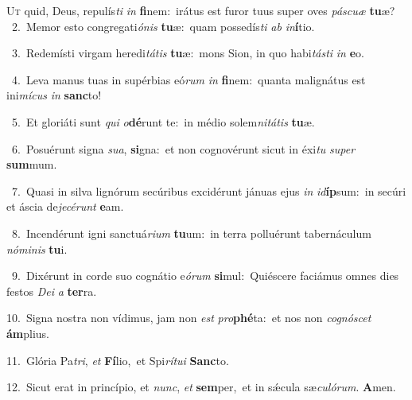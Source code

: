 \lettrine{\initial\textcolor{\initialcolor}{U}}{t} quid, Deus, repulís\textit{ti} \textit{in} \textbf{fi}\-nem:~\star irátus est furor tuus super oves \textit{pás}\-\textit{cu}\textit{æ} \textbf{tu}\-æ?\\
{\numbfont\textcolor{\numbcolor}{~2.}}~Memor esto congregati\-\textit{ó}\-\textit{nis} \textbf{tu}\-æ:~\star quam possedís\textit{ti} \textit{ab} \textit{in}\-\textbf{í}tio.\par
{\numbfont\textcolor{\numbcolor}{~3.}}~Redemísti virgam heredi\-\textit{tá}\-\textit{tis} \textbf{tu}\-æ:~\star mons Sion, in quo habi\-\textit{tás}\-\textit{ti} \textit{in} \textbf{e}\-o.\par
{\numbfont\textcolor{\numbcolor}{~4.}}~Leva manus tuas in supérbias eó\textit{rum} \textit{in} \textbf{fi}\-nem:~\star quanta malignátus est ini\-\textit{mí}\-\textit{cus} \textit{in} \textbf{sanc}\-to!\par
{\numbfont\textcolor{\numbcolor}{~5.}}~Et gloriáti sunt \textit{qui} \textit{o}\-\textbf{dé}runt te:~\star in médio solem\-\textit{ni}\-\textit{tá}\textit{tis} \textbf{tu}\-æ.\par
{\numbfont\textcolor{\numbcolor}{~6.}}~Posuérunt signa \textit{su}\-\textit{a}, \textbf{si}\-gna:~\star et non cognovérunt sicut in éxi\textit{tu} \textit{su}\-\textit{per} \textbf{sum}\-mum.\par
{\numbfont\textcolor{\numbcolor}{~7.}}~Quasi in silva lignórum secúribus excidérunt jánuas ejus \textit{in} \textit{id}\-\textbf{íp}sum:~\star in secúri et áscia de\-\textit{je}\-\textit{cé}\textit{runt} \textbf{e}\-am.\par
{\numbfont\textcolor{\numbcolor}{~8.}}~Incendérunt igni sanctuá\-\textit{ri}\-\textit{um} \textbf{tu}\-um:~\star in terra polluérunt tabernáculum \textit{nó}\-\textit{mi}\textit{nis} \textbf{tu}\-i.\par
{\numbfont\textcolor{\numbcolor}{~9.}}~Dixérunt in corde suo cognátio e\-\textit{ó}\-\textit{rum} \textbf{si}\-mul:~\star Quiéscere faciámus omnes dies festos \textit{De}\-\textit{i} \textit{a} \textbf{ter}\-ra.\par
{\numbfont\textcolor{\numbcolor}{10.}}~Signa nostra non vídimus, jam non \textit{est} \textit{pro}\-\textbf{phé}ta:~\star et nos non \textit{co}\-\textit{gnó}\textit{scet} \textbf{ám}\-plius.\par
{\numbfont\textcolor{\numbcolor}{11.}}~Glória Pa\-\textit{tri}\-, \textit{et} \textbf{Fí}\-lio,~\star et Spi\-\textit{rí}\-\textit{tu}\textit{i} \textbf{Sanc}\-to.\par
{\numbfont\textcolor{\numbcolor}{12.}}~Sicut erat in princípio, et \textit{nunc}\-, \textit{et} \textbf{sem}\-per,~\star et in sǽcula sæ\-\textit{cu}\-\textit{ló}\textit{rum}. \textbf{A}\-men.\par
